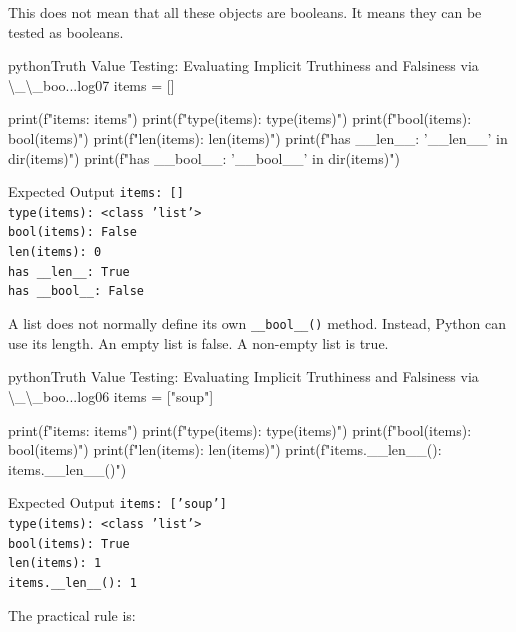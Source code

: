 This does not mean that all these objects are booleans. It means they can be tested as booleans.

\begin{codebox}[]{python}{Truth Value Testing: Evaluating Implicit Truthiness and Falsiness via \textbackslash{}\_\textbackslash{}\_boo...}{log07}
items = []

print(f"items: {items}")
print(f"type(items): {type(items)}")
print(f"bool(items): {bool(items)}")
print(f"len(items): {len(items)}")
print(f"has __len__: {'__len__' in dir(items)}")
print(f"has __bool__: {'__bool__' in dir(items)}")
\end{codebox}


\begin{iobox}{Expected Output}
\texttt{items: []} \\
\texttt{type(items): <class 'list'>} \\
\texttt{bool(items): False} \\
\texttt{len(items): 0} \\
\texttt{has \_\_len\_\_: True} \\
\texttt{has \_\_bool\_\_: False} \\
\end{iobox}


A list does not normally define its own \texttt{\_\_bool\_\_()} method. Instead, Python can use its length. An empty list is false. A non-empty list is true.

\begin{codebox}[]{python}{Truth Value Testing: Evaluating Implicit Truthiness and Falsiness via \textbackslash{}\_\textbackslash{}\_boo...}{log06}
items = ["soup"]

print(f"items: {items}")
print(f"type(items): {type(items)}")
print(f"bool(items): {bool(items)}")
print(f"len(items): {len(items)}")
print(f"items.__len__(): {items.__len__()}")
\end{codebox}


\begin{iobox}{Expected Output}
\texttt{items: ['soup']} \\
\texttt{type(items): <class 'list'>} \\
\texttt{bool(items): True} \\
\texttt{len(items): 1} \\
\texttt{items.\_\_len\_\_(): 1} \\
\end{iobox}


The practical rule is:

